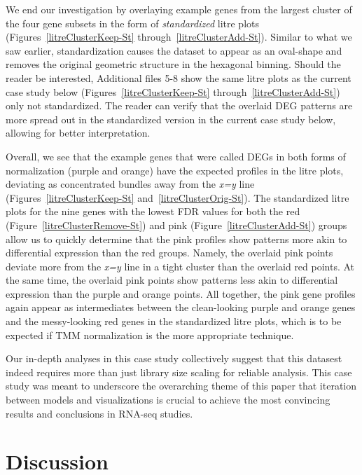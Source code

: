 \documentclass{bmcart}
\begin{document}
\begin{linenumbers}
\begin{doublespacing}
We end our investigation by overlaying example genes from the largest cluster of the four gene subsets in the form of \textit{standardized} litre plots (Figures~\ref{litreClusterKeep-St} through~\ref{litreClusterAdd-St}). Similar to what we saw earlier, standardization causes the dataset to appear as an oval-shape and removes the original geometric structure in the hexagonal binning. Should the reader be interested, Additional files 5-8 show the same litre plots as the current case study below (Figures~\ref{litreClusterKeep-St} through~\ref{litreClusterAdd-St}) only not standardized. The reader can verify that the overlaid DEG patterns are more spread out in the standardized version in the current case study below, allowing for better interpretation.

Overall, we see that the example genes that were called DEGs in both forms of normalization (purple and orange) have the expected profiles in the litre plots, deviating as concentrated bundles away from the \textit{x=y} line (Figures~\ref{litreClusterKeep-St} and~\ref{litreClusterOrig-St}). The standardized litre plots for the nine genes with the lowest FDR values for both the red (Figure~\ref{litreClusterRemove-St}) and pink (Figure~\ref{litreClusterAdd-St}) groups allow us to quickly determine that the pink profiles show patterns more akin to differential expression than the red groups. Namely, the overlaid pink points deviate more from the \textit{x=y} line in a tight cluster than the overlaid red points. At the same time, the overlaid pink points show patterns less akin to differential expression than the purple and orange points. All together, the pink gene profiles again appear as intermediates between the clean-looking purple and orange genes and the messy-looking red genes in the standardized litre plots, which is to be expected if TMM normalization is the more appropriate technique.

Our in-depth analyses in this case study collectively suggest that this datasest indeed requires more than just library size scaling for reliable analysis. This case study was meant to underscore the overarching theme of this paper that iteration between models and visualizations is crucial to achieve the most convincing results and conclusions in RNA-seq studies.

\section*{Discussion}


\end{doublespacing}
\end{linenumbers}
\end{document}
